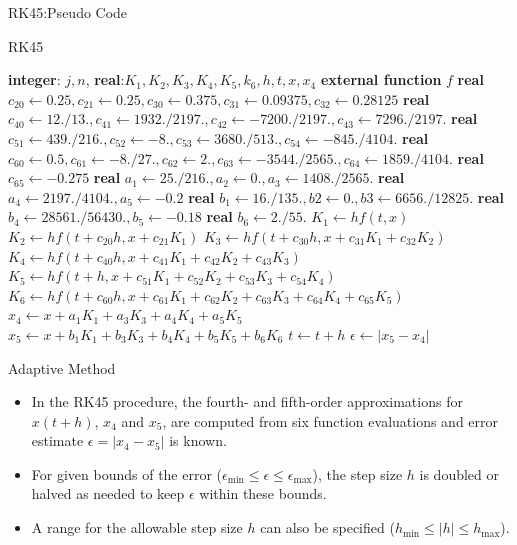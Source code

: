\documentclass{beamer}
\newcommand{\afterverb}{\normalsize}
\begin{document}
\begin{frame}{RK45:Pseudo Code}
\begin{block}{RK45}
\begin{algorithmic}[]
\tiny
{}
\State \textbf{integer}: $j, n$, \textbf{real}:$K_1, K_2, K_3, K_4, K_5, k_6, h, t, x, x_4$
\State \textbf{external function} $f$
\State \textbf{real} $c_{20} \gets 0.25, c_{21} \gets 0.25, c_{30} \gets 0.375, c_{31} \gets 0.09375, c_{32} \gets 0.28125$
\State \textbf{real} $c_{40} \gets 12./13., c_{41} \gets 1932./2197. , c_{42} \gets -7200./2197., c_{43} \gets 7296./2197.$
\State \textbf{real} $c_{51} \gets 439./216., c_{52} \gets -8., c_{53} \gets 3680./513., c_{54} \gets -845./4104.$
\State \textbf{real} $c_{60} \gets 0.5, c_{61} \gets -8./27., c_{62}\gets  2., c_{63} \gets -3544./2565., c_{64} \gets 1859./4104.$
\State \textbf{real} $c_{65} \gets -0.275$
\State \textbf{real} $a_1 \gets 25./216., a_2 \gets 0., a_3 \gets 1408./2565. $
\State \textbf{real} $a_4 \gets 2197./4104., a_5 \gets -0.2$
\State \textbf{real} $b_1 \gets 16./135., b2 \gets 0., b3 \gets 6656./12825.$ 
\State \textbf{real} $b_4 \gets 28561./56430., b_5 \gets -0.18$
\State \textbf{real} $b_6 \gets 2./55.$
\State  $K_1 \gets hf(t,x)$
\State $K_2 \gets h f(t+c_{20}h,x+c_{21}K_1) $
\State $K_3 \gets hf(t+c_{30}h,x+c_{31}K_1 +c_{32}K_2) $
\State $K_4 \gets hf(t+c_{40}h,x+c_{41}K_1 +c_{42}K_2 +c_{43}K_3) $
\State $K_ 5\gets hf(t+h,x+c_{51}K_1 +c_{52}K_2 +c_{53}K_3 +c_{54}K_4) $
\State $K_6 \gets hf(t+c_{60}h,x+c_{61}K_1 +c_{62}K_2 +c_{63}K_3 +c_{64}K_4 +c_{65}K_5)$
\State $x_4 \gets x +a_1K_1 +a_3K_3 +a_4K_4 +a_5K_5 $
\State $x_5 \gets x +b_1K_1 +b_3K_3 +b_4K_4 +b_5K_5 +b_6K_6$
\State $ t \gets t+h $
\State $\epsilon  \gets |x_5 -x_4|$
\EndProcedure
\end{algorithmic}
\afterverb
\end{block}
\end{frame}
\begin{frame}{Adaptive Method }
\begin{itemize}
\item  In the RK45 procedure, the fourth- and fifth-order approximations for $x(t + h)$,  $x_4$ and $x_5$, are computed from six function evaluations and error estimate $\epsilon = |x_4 - x_5|$ is known.
\item For given bounds of the error  ($\epsilon_{\min} \le \epsilon \le \epsilon_{\max}$), the step size $h$ is doubled or halved as needed to keep $\epsilon$ within these bounds. 
\item A range for the allowable step size $h$ can  also be specified ($h_{\min} \le |h| \le h_{\max}$). 
\end{itemize}
\end{frame}
\end{document}
